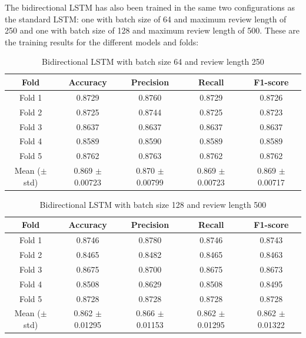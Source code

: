 \documentclass{article}
\begin{document}
The bidirectional LSTM has also been trained in the same two configurations as the standard LSTM: one with batch size of 64 and maximum review length of 250 and one with batch size of 128 and maximum review length of 500.
These are the training results for the different models and folds: 

\begin{table}[H]
  \centering
  \begin{tabular}{c|cccc}
      \toprule
      \textbf{Fold} & \textbf{Accuracy} & \textbf{Precision} & \textbf{Recall} & \textbf{F1-score} \\
      \midrule
      Fold 1 & 0.8729 & 0.8760 & 0.8729 & 0.8726 \\
      Fold 2 & 0.8725 & 0.8744 & 0.8725 & 0.8723 \\
      Fold 3 & 0.8637 & 0.8637 & 0.8637 & 0.8637 \\
      Fold 4 & 0.8589 & 0.8590 & 0.8589 & 0.8589 \\
      Fold 5 & 0.8762 & 0.8763 & 0.8762 & 0.8762 \\
      \midrule
      Mean ($\pm$ std) & 0.869 $\pm$ 0.00723 & 0.870 $\pm$ 0.00799 & 0.869 $\pm$ 0.00723 & 0.869 $\pm$ 0.00717 \\
      \bottomrule
  \end{tabular}
  \vspace{0.5em}
  \caption{Bidirectional LSTM with batch size 64 and review length 250}
\end{table}

\begin{table}[H]
  \centering
  \begin{tabular}{c|cccc}
      \toprule
      \textbf{Fold} & \textbf{Accuracy} & \textbf{Precision} & \textbf{Recall} & \textbf{F1-score} \\
      \midrule
      Fold 1 & 0.8746 & 0.8780 & 0.8746 & 0.8743 \\
      Fold 2 & 0.8465 & 0.8482 & 0.8465 & 0.8463 \\
      Fold 3 & 0.8675 & 0.8700 & 0.8675 & 0.8673 \\
      Fold 4 & 0.8508 & 0.8629 & 0.8508 & 0.8495 \\
      Fold 5 & 0.8728 & 0.8728 & 0.8728 & 0.8728 \\
      \midrule
      Mean ($\pm$ std) & 0.862 $\pm$ 0.01295 & 0.866 $\pm$ 0.01153 & 0.862 $\pm$ 0.01295 & 0.862 $\pm$ 0.01322 \\
      \bottomrule
  \end{tabular}
  \vspace{0.5em}
  \caption{Bidirectional LSTM with batch size 128 and review length 500}
\end{table}
\end{document}
